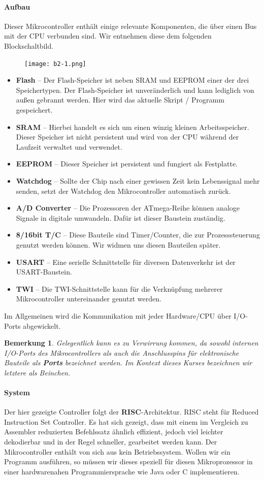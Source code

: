 \documentclass[11pt,a4paper]{scrartcl}
\newtheorem{note}{Bemerkung}
\begin{document}
\paragraph{Aufbau}
Dieser Mikrocontroller enthält einige relevante Komponenten, die über einen Bus mit der CPU verbunden sind. Wir entnehmen diese dem folgenden Blockschaltbild.
\begin{figure}[h!]
\centering
\texttt{[image: b2-1.png]}
\end{figure}
\begin{itemize}
\item \textbf{Flash} -- Der Flash-Speicher ist neben SRAM und EEPROM einer der drei Speichertypen. Der Flash-Speicher ist unveränderlich und kann lediglich von außen gebrannt werden. Hier wird das aktuelle Skript / Programm gespeichert.
\item \textbf{SRAM} -- Hierbei handelt es sich um einen winzig kleinen Arbeitsspeicher. Dieser Speicher ist nicht persistent und wird von der CPU während der Laufzeit verwaltet und verwendet.
\item \textbf{EEPROM} -- Dieser Speicher ist persistent und fungiert als {\glqq}Festplatte{\grqq}.
\item \textbf{Watchdog} -- Sollte der Chip nach einer gewissen Zeit kein Lebenssignal mehr senden, setzt der Watchdog den Mikrocontroller automatisch zurück.
\item \textbf{A/D Converter} -- Die Prozessoren der ATmega-Reihe können analoge Signale in digitale umwandeln. Dafür ist dieser Baustein zuständig.
\item \textbf{8/16bit T/C} -- Diese Bauteile sind Timer/Counter, die zur Prozesssteuerung genutzt werden können. Wir widmen uns diesen Bauteilen später.
\item \textbf{USART} -- Eine serielle Schnittstelle für diversen Datenverkehr ist der USART-Baustein.
\item \textbf{TWI} -- Die TWI-Schnittstelle kann für die Verknüpfung mehrerer Mikrocontroller untereinander genutzt werden.
\end{itemize}
Im Allgemeinen wird die Kommunikation mit jeder Hardware/CPU über I/O-Ports abgewickelt. 
\begin{note}
Gelegentlich kann es zu Verwirrung kommen, da sowohl internen I/O-Ports des Mikrocontrollers als auch die Anschlusspins für elektronische Bauteile als \textbf{Ports} bezeichnet werden. Im Kontext dieses Kurses bezeichnen wir letztere als {\glqq}Beinchen{\grqq}.
\end{note}
\paragraph{System} Der hier gezeigte Controller folgt der \textbf{RISC}-Architektur. RISC steht für {\glqq}Reduced Instruction Set Controller{\grqq}. Es hat sich gezeigt, dass mit einem im Vergleich zu Assembler reduzierten Befehlssatz ähnlich effizient, jedoch viel leichter dekodierbar und in der Regel schneller, gearbeitet werden kann. Der Mikrocontroller enthält von sich aus kein Betriebssystem. Wollen wir ein Programm ausführen, so müssen wir dieses speziell für diesen Mikroprozessor in einer hardwarenahen Programmiersprache wie Java oder C implementieren.
\end{document}
